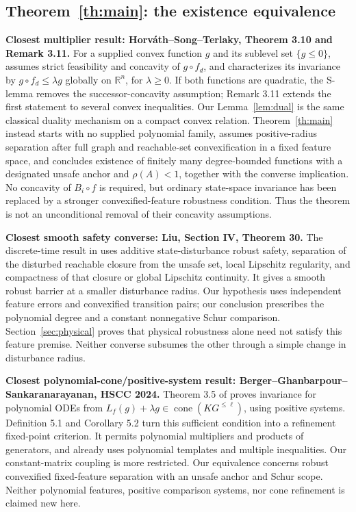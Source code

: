 \documentclass[10pt,letterpaper]{article}
\theoremstyle{remark}
\newcommand{\R}{\mathbb R}
\begin{document}
\subsection{Theorem~\ref{th:main}: the existence equivalence}
\textbf{Closest multiplier result: Horv\'ath--Song--Terlaky, Theorem 3.10 and Remark 3.11.}
For a supplied convex function $g$ and its sublevel set $\{g\leq0\}$, \cite{hst} assumes
strict feasibility and concavity of $g\circ f_d$, and characterizes its
invariance by $g\circ f_d\leq\lambda g$ globally on $\R^n$, for
$\lambda\geq0$. If both functions are quadratic, the S-lemma removes the
successor-concavity assumption; Remark 3.11 extends the first statement
to several convex inequalities.
Our Lemma~\ref{lem:dual} is the same classical duality mechanism on a compact
convex relation. Theorem~\ref{th:main} instead starts with no supplied
polynomial family, assumes positive-radius separation after full graph and
reachable-set convexification in a fixed feature space, and concludes existence
of finitely many degree-bounded functions with a designated unsafe anchor and
$\rho(A)<1$, together with the converse implication.
No concavity of $B_i\circ f$ is required, but ordinary state-space invariance
has been replaced by a stronger convexified-feature robustness condition.
Thus the theorem is not an unconditional removal of their concavity assumptions.

\textbf{Closest smooth safety converse: Liu, Section IV, Theorem 30.}
The discrete-time result in \cite{liu} uses additive state-disturbance robust
safety, separation of the disturbed reachable closure from the unsafe set,
local Lipschitz regularity, and compactness of that closure or global
Lipschitz continuity. It gives a smooth robust barrier at a smaller disturbance
radius. Our hypothesis uses independent feature errors and convexified
transition pairs; our conclusion prescribes the polynomial degree and a
constant nonnegative Schur comparison. Section~\ref{sec:physical} proves
that physical robustness alone need not satisfy this feature premise.
Neither converse subsumes the other through a simple change in disturbance radius.

\textbf{Closest polynomial-cone/positive-system result: Berger--Ghanbarpour--Sankaranarayanan, HSCC 2024.}
Theorem 3.5 of \cite{cone2024} proves invariance for polynomial ODEs from
$L_f(g)+\lambda g\in\operatorname{cone}(K G^{\leq\ell})$, using positive
systems. Definition 5.1 and Corollary 5.2 turn this sufficient condition into
a refinement fixed-point criterion. It permits polynomial multipliers and
products of generators, and already uses polynomial templates and multiple
inequalities. Our constant-matrix coupling is more restricted. Our equivalence concerns
robust convexified fixed-feature separation with an unsafe anchor and Schur scope.
Neither polynomial features, positive comparison systems, nor cone refinement
is claimed new here.
\end{document}
